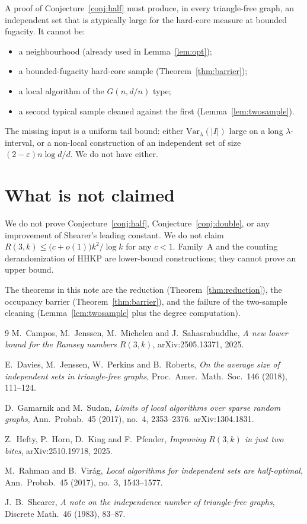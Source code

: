 \documentclass[11pt]{article}
\theoremstyle{definition}
\newcommand{\eps}{\varepsilon}
\newcommand{\Var}{\mathrm{Var}}
\begin{document}
A proof of Conjecture~\ref{conj:half} must produce, in every triangle-free
graph, an independent set that is atypically large for the hard-core measure
at bounded fugacity. It cannot be:
\begin{itemize}
  \item a neighbourhood (already used in Lemma~\ref{lem:opt});
  \item a bounded-fugacity hard-core sample (Theorem~\ref{thm:barrier});
  \item a local algorithm of the $G(n,d/n)$ type;
  \item a second typical sample cleaned against the first (Lemma~\ref{lem:twosample}).
\end{itemize}
The missing input is a uniform tail bound: either
$\Var_{\lambda}(|I|)$ large on a long $\lambda$-interval, or a
non-local construction of an independent set of size
$(2-\eps)n\log d/d$. We do not have either.

\section{What is not claimed}

We do not prove Conjecture~\ref{conj:half}, Conjecture~\ref{conj:double}, or
any improvement of Shearer's leading constant.
We do not claim $R(3,k)\le\bigl(c+o(1)\bigr)k^{2}/\log k$ for any $c<1$.
Family~A and the counting derandomization of HHKP are lower-bound constructions;
they cannot prove an upper bound.

The theorems in this note are the reduction (Theorem~\ref{thm:reduction}),
the occupancy barrier (Theorem~\ref{thm:barrier}), and the failure of the
two-sample cleaning (Lemma~\ref{lem:twosample} plus the degree computation).

\begin{thebibliography}{9}
M.~Campos, M.~Jenssen, M.~Michelen and J.~Sahasrabuddhe,
\emph{A new lower bound for the Ramsey numbers $R(3,k)$},
arXiv:2505.13371, 2025.

E.~Davies, M.~Jenssen, W.~Perkins and B.~Roberts,
\emph{On the average size of independent sets in triangle-free graphs},
Proc.\ Amer.\ Math.\ Soc.\ 146 (2018), 111--124.

D.~Gamarnik and M.~Sudan,
\emph{Limits of local algorithms over sparse random graphs},
Ann.\ Probab.\ 45 (2017), no.~4, 2353--2376.
\newblock arXiv:1304.1831.

Z.~Hefty, P.~Horn, D.~King and F.~Pfender,
\emph{Improving $R(3,k)$ in just two bites},
arXiv:2510.19718, 2025.

M.~Rahman and B.~Vir\'ag,
\emph{Local algorithms for independent sets are half-optimal},
Ann.\ Probab.\ 45 (2017), no.~3, 1543--1577.

J.~B.~Shearer,
\emph{A note on the independence number of triangle-free graphs},
Discrete Math.\ 46 (1983), 83--87.
\end{thebibliography}
\end{document}
